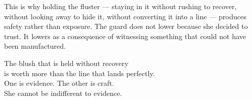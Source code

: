 This is why holding the fluster --- staying in it without rushing to recover, 
without looking away to hide it, without converting it into a line --- 
produces safety rather than exposure. The guard does not lower because 
she decided to trust. It lowers as a consequence of witnessing something 
that could not have been manufactured.

\begin{calloutbox}
The blush that is held without recovery\\
is worth more than the line that lands perfectly.\\[0.4em]
One is evidence. The other is craft.\\
She cannot be indifferent to evidence.
\end{calloutbox}